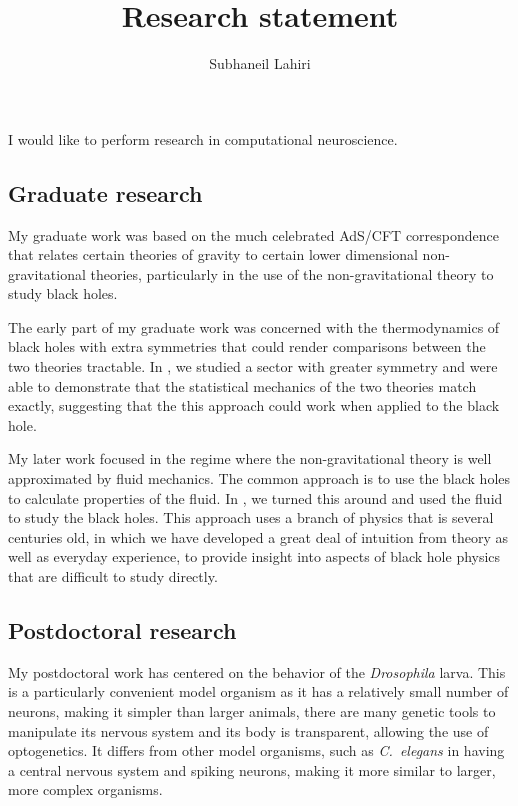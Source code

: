 \documentclass[12pt]{article}
\title{Research statement}
\author{Subhaneil Lahiri}
\begin{document}
\maketitle







I would like to perform research in computational neuroscience.

\subsection*{Graduate research}

My graduate work was based on the much celebrated AdS/CFT correspondence that relates certain theories of gravity to certain lower dimensional non-gravitational theories, particularly in the use of the non-gravitational theory to study black holes.

The early part of my graduate work was concerned with the thermodynamics of black holes with extra symmetries that could render comparisons between the two theories tractable. In \cite{Biswas:2006tj}, we studied a sector with greater symmetry and were able to demonstrate that the statistical mechanics of the two theories match exactly, suggesting that the this approach could work when applied to the black hole.

My later work focused in the regime where the non-gravitational theory is well approximated by fluid mechanics. The common approach is to use the black holes to calculate properties of the fluid. In \cite{Lahiri:2007ae,Bhattacharyya:2007vs,Bhattacharya:2009gm}, we turned this around and used the fluid to study the black holes. This approach uses a branch of physics that is several centuries old, in which we have developed a great deal of intuition from theory as well as everyday experience, to provide insight into aspects of black hole physics that are difficult to study directly.


\subsection*{Postdoctoral research}

My postdoctoral work has centered on the behavior of the \emph{Drosophila} larva. This is a particularly convenient model organism as it has a relatively small number of neurons, making it simpler than larger animals, there are many genetic tools to manipulate its nervous system and its body is transparent, allowing the use of optogenetics. It differs from other model organisms, such as \emph{C.\ elegans} in having a central nervous system and spiking neurons, making it more similar to larger, more complex organisms.
\end{document}
